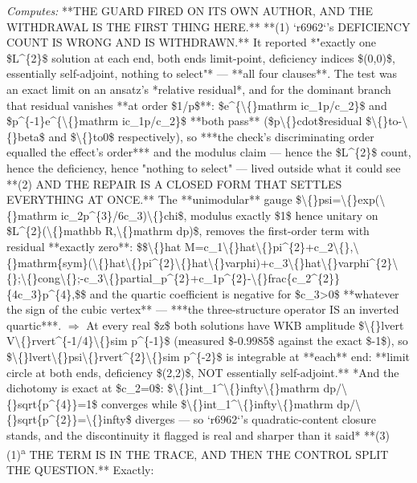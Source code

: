 \begin{description}
\emph{Computes:} **THE GUARD FIRED ON ITS OWN AUTHOR, AND THE WITHDRAWAL IS THE FIRST THING HERE.**  **(1)  `r6962`'s DEFICIENCY COUNT IS WRONG AND IS WITHDRAWN.** It reported *"exactly one \$L\textasciicircum{}\{2\}\$ solution at each end, both ends limit-point, deficiency indices \$(0,0)\$, essentially self-adjoint, nothing to select"* --- **all four clauses**. The test was an exact limit on an ansatz's *relative residual*, and for the dominant branch that residual vanishes **at order \$1/p\$**: \$e\textasciicircum{}\{\textbackslash\{\}mathrm ic\_1p/c\_2\}\$ and \$p\textasciicircum{}\{-1\}e\textasciicircum{}\{\textbackslash\{\}mathrm ic\_1p/c\_2\}\$ **both pass** (\$p\textbackslash\{\}cdot\$residual \$\textbackslash\{\}to-\textbackslash\{\}beta\$ and \$\textbackslash\{\}to0\$ respectively), so ***the check's discriminating order equalled the effect's order*** and the modulus claim --- hence the \$L\textasciicircum{}\{2\}\$ count, hence the deficiency, hence "nothing to select" --- lived outside what it could see  **(2)  AND THE REPAIR IS A CLOSED FORM THAT SETTLES EVERYTHING AT ONCE.** The **unimodular** gauge \$\textbackslash\{\}psi=\textbackslash\{\}exp(\textbackslash\{\}mathrm ic\_2p\textasciicircum{}\{3\}/6c\_3)\textbackslash\{\}chi\$, modulus exactly \$1\$ hence unitary on \$L\textasciicircum{}\{2\}(\textbackslash\{\}mathbb R,\textbackslash\{\}mathrm dp)\$, removes the first-order term with residual **exactly zero**: \$\$\textbackslash\{\}hat M=c\_1\textbackslash\{\}hat\textbackslash\{\}pi\textasciicircum{}\{2\}+c\_2\textbackslash\{\},\textbackslash\{\}mathrm\{sym\}(\textbackslash\{\}hat\textbackslash\{\}pi\textasciicircum{}\{2\}\textbackslash\{\}hat\textbackslash\{\}varphi)+c\_3\textbackslash\{\}hat\textbackslash\{\}varphi\textasciicircum{}\{2\}\textbackslash\{\};\textbackslash\{\}cong\textbackslash\{\};-c\_3\textbackslash\{\}partial\_p\textasciicircum{}\{2\}+c\_1p\textasciicircum{}\{2\}-\textbackslash\{\}frac\{c\_2\textasciicircum{}\{2\}\}\{4c\_3\}p\textasciicircum{}\{4\},\$\$ and the quartic coefficient is negative for \$c\_3>0\$ **whatever the sign of the cubic vertex** --- ***the three-structure operator IS an inverted quartic***. \ensuremath{\Rightarrow} At every real \$z\$ both solutions have WKB amplitude \$\textbackslash\{\}lvert V\textbackslash\{\}rvert\textasciicircum{}\{-1/4\}\textbackslash\{\}sim p\textasciicircum{}\{-1\}\$ (measured \$-0.9985\$ against the exact \$-1\$), so \$\textbackslash\{\}lvert\textbackslash\{\}psi\textbackslash\{\}rvert\textasciicircum{}\{2\}\textbackslash\{\}sim p\textasciicircum{}\{-2\}\$ is integrable at **each** end: **limit circle at both ends, deficiency \$(2,2)\$, NOT essentially self-adjoint.**  *And the dichotomy is exact at \$c\_2=0\$: \$\textbackslash\{\}int\_1\textasciicircum{}\textbackslash\{\}infty\textbackslash\{\}mathrm dp/\textbackslash\{\}sqrt\{p\textasciicircum{}\{4\}\}=1\$ converges while \$\textbackslash\{\}int\_1\textasciicircum{}\textbackslash\{\}infty\textbackslash\{\}mathrm dp/\textbackslash\{\}sqrt\{p\textasciicircum{}\{2\}\}=\textbackslash\{\}infty\$ diverges --- so `r6962`'s quadratic-content closure stands, and the discontinuity it flagged is real and sharper than it said*  **(3) (1)\textsuperscript{a} THE TERM IS IN THE TRACE, AND THEN THE CONTROL SPLIT THE QUESTION.** Exactly: 
\end{description}
